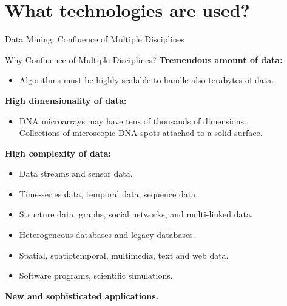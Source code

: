 \section{What technologies are used?}

\begin{frame}{Data Mining: Confluence of Multiple Disciplines}
	\centering
\end{frame}

\begin{frame}{Why Confluence of Multiple Disciplines?}
	\textbf{Tremendous amount of data:}
	\begin{itemize}
		\item Algorithms must be highly scalable to handle also terabytes of 
		data.
	\end{itemize}
	
	\textbf{High dimensionality of data:}
	\begin{itemize}
		\item DNA microarrays may have tens of thousands of dimensions.\\
		Collections of microscopic DNA spots attached to a solid surface.
	\end{itemize}
	
	\textbf{High complexity of data:}
	\begin{itemize}
		\item Data streams and sensor data.
		\item Time-series data, temporal data, sequence data.
		\item Structure data, graphs, social networks, and multi-linked data.
		\item Heterogeneous databases and legacy databases.
		\item Spatial, spatiotemporal, multimedia, text and web data.
		\item Software programs, scientific simulations.
	\end{itemize}
	\textbf{New and sophisticated applications.}
\end{frame}